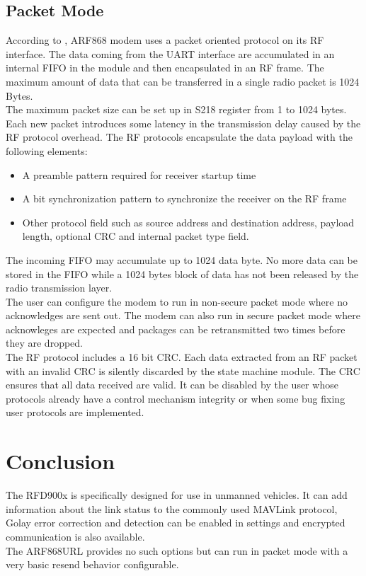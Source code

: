 \subsection{Packet Mode}
According to \cite{ARF_Datasheet}, ARF868 modem uses a packet oriented protocol on its RF interface. The data coming from the UART interface are accumulated in an internal FIFO in the module and then encapsulated in an RF frame. The maximum amount of data that can be transferred in a single radio packet is 1024 Bytes.\\
The maximum packet size can be set up in S218 register from 1 to 1024 bytes. Each new packet introduces some latency in the transmission delay caused by the RF protocol overhead. The RF protocols encapsulate the data payload with the following elements:
\begin{itemize}
    \item  A preamble pattern required for receiver startup time
    \item A bit synchronization pattern to synchronize the receiver on the RF frame
    \item Other protocol field such as source address and destination address, payload length, optional CRC and internal packet type field.
\end{itemize}
The incoming FIFO may accumulate up to 1024 data byte. No more data can be stored in the FIFO while a 1024 bytes block of data has not been released by the radio transmission layer.\\
The user can configure the modem to run in non-secure packet mode where no acknowledges are sent out. The modem can also run in secure packet mode where acknowleges are expected and packages can be retransmitted two times before they are dropped. \\
The RF protocol includes a 16 bit CRC. Each data extracted from an RF packet with an invalid CRC is silently discarded by the state machine module. The CRC ensures that all data received are valid. It can be disabled by the user whose protocols already have a control mechanism integrity or when some bug fixing user protocols are implemented.
%
\section{Conclusion}
The RFD900x is specifically designed for use in unmanned vehicles. It can add information about the link status to the commonly used MAVLink protocol, Golay error correction and detection can be enabled in settings and encrypted communication is also available.\\
The ARF868URL provides no such options but can run in packet mode with a very basic resend behavior configurable.
